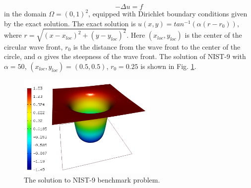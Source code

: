 \documentclass[12pt]{elsarticle}
\begin{document}
\begin{equation} \label{wave-front}
-\Delta u = f
\end{equation}
in the domain $\Omega = (0, 1)^2$, equipped with Dirichlet boundary conditions
given by the exact solution. The exact solution is
$u(x, y) = tan^{-1}(\alpha (r - r_{0}))$,
where $r = \sqrt{(x - x_{loc})^{2} + (y - y_{loc})^{2}}$.
Here $(x_{loc}, y_{loc})$ is the center of the circular wave front,
$r_{0}$ is the distance from the wave front to the center of the circle,
and $\alpha$ gives the steepness of the wave front.
The solution of NIST-9 with $\alpha = 50$, $(x_{loc}, y_{loc}) = (0.5, 0.5)$,
$r_{0} = 0.25$ is shown in Fig. \ref{fig:sln-nist09}.

\begin{figure}[H]
\centering
\vspace{-3mm}
\includegraphics[height=5cm]{nist/nist-9/solution.png}
\vspace{-3mm}
\caption{The solution to NIST-9 benchmark problem.}
\vspace{-3mm}
\label{fig:sln-nist09}
\end{figure}
\end{document}
